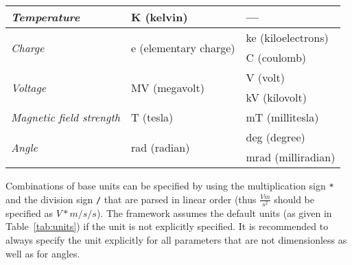 \begin{table}[tbp]
\begin{tabular}{lll}
\midrule
\textit{Temperature}              & K (kelvin)                              & ---                      \\
\midrule
\multirow{2}{*}{\textit{Charge}}  & \multirow{2}{*}{e (elementary charge)}  & ke (kiloelectrons)       \\
                                  &                                         & C (coulomb)              \\
\midrule
\multirow{2}{*}{\textit{Voltage}} & \multirow{2}{*}{MV (megavolt)}          & V (volt)                 \\
                                  &                                         & kV (kilovolt)            \\
\midrule
\textit{Magnetic field strength}  & T (tesla)                               & mT (millitesla)          \\
\midrule
\multirow{2}{*}{\textit{Angle}}   & \multirow{2}{*}{rad (radian)}           & deg (degree)             \\
                                  &                                         & mrad (milliradian)       \\
\bottomrule
\end{tabular}
\end{table}

Combinations of base units can be specified by using the multiplication sign \texttt{*} and the division sign \texttt{/} that are parsed in linear order (thus $\frac{V m}{s^2}$ should be specified as $V*m/s/s$).
The framework assumes the default units (as given in Table~\ref{tab:units}) if the unit is not explicitly specified.
It is recommended to always specify the unit explicitly for all parameters that are not dimensionless as well as for angles.

